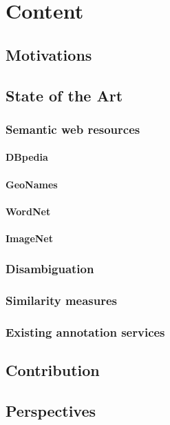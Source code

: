 \section{Content}

% 
% 
\subsection{Motivations}

% 
% 
\subsection{State of the Art}

\subsubsection{Semantic web resources}
\paragraph{DBpedia}
\paragraph{GeoNames}
\paragraph{WordNet}
\paragraph{ImageNet}

\subsubsection{Disambiguation}

\subsubsection{Similarity measures}

\subsubsection{Existing annotation services}

% 
% 
\subsection{Contribution}

% 
% 
\subsection{Perspectives}